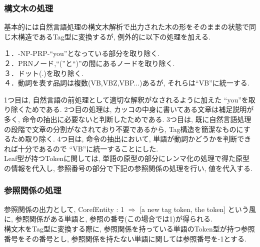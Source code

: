 \documentclass[uplatex,a4j]{jsreport}
\begin{document}
\subsubsection{構文木の処理}
\label{構文木の処理}
基本的には自然言語処理の構文木解析で出力された木の形をそのままの状態で同じ木構造であるTag型に変換するが,
例外的に以下の処理を加える.\\%
\begin{screen}
１．-NP-PRP-``you''となっている部分を取り除く.\\
２．PRNノード,``(''と``)''の間にあるノードを取り除く.\\
３．ドット(.)を取り除く.\\
４．動詞を表す品詞は複数(VB,VBZ,VBP...)あるが, それらは``VB''に統一する.
\end{screen}
1つ目は, 自然言語の前処理として適切な解釈がなされるように加えた ``you''を取り除くためである.
2つ目の処理は, カッコの中身に書いてある文章は補足説明が多く, 命令の抽出に必要ないと判断したためである.
3つ目は, 既に自然言語処理の段階で文章の分割がなされており不要であるから, Tag構造を簡潔なものにするため取り除く.
4つ目は, 命令の抽出において, 単語が動詞かどうかを判断できれば十分であるので ``VB''に統一することにした.\\

Leaf型が持つTokenに関しては, 単語の原型の部分にレンマ化の処理で得た原型の情報を代入し, 参照番号の部分で下記の参照関係の処理を行い, 値を代入する.
\subsubsection{参照関係の処理}
参照関係の出力として, CorefEntity : 1 $\Rightarrow$ [a new tag token, the token]
という風に, 参照関係がある単語と, 参照の番号(この場合では1)が得られる. \\
構文木をTag型に変換する際に, 参照関係を持っている単語のToken型が持つ参照番号をその番号とし, 
参照関係を持たない単語に関しては参照番号を-1とする.\\
\end{document}
